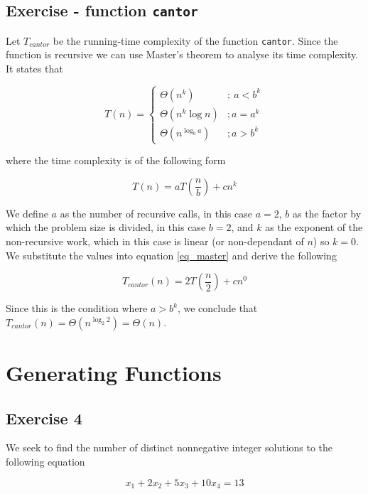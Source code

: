\documentclass[a4paper]{article}
\begin{document}
\subsection{Exercise - function \texttt{cantor}}
Let $T_{cantor}$ be the running-time complexity of the function \texttt{cantor}. Since the function is recursive we can use Master's theorem
to analyse its time complexity. It states that

\begin{equation*}
    T(n) = \left \{ 
        \begin{array}{lc}
            \Theta (n^k)&;\ a < b^k\\
            \Theta (n^k \log n)&; a = a^k\\
            \Theta (n^{\log_b a})&; a > b^k
        \end{array}
    \right .    
\end{equation*}

\noindent
where  the time complexity is of the following form

\label{eq_master}
\begin{equation}
    T(n) = aT(\frac n b) + cn^k
\end{equation}

We define $a$ as the number of recursive calls, in this case $a = 2$, $b$ as the factor by which the problem size is divided, in this case $b=2$, and
$k$ as the exponent of the non-recursive work, which in this case is linear (or non-dependant of $n$) so $k = 0$. We substitute the values into equation
\ref{eq_master} and derive the following

\begin{equation}
    T_{cantor} (n) = 2T(\frac n 2) + cn^0
\end{equation}

Since this is the condition where $a > b^k$, we conclude that $T_{cantor} (n) = \Theta (n^{\log_2 2}) = \Theta(n)$.

\section{Generating Functions}

\subsection{Exercise 4}

We seek to find the number of distinct nonnegative integer solutions to the following equation

\label{naloga4}
\begin{equation}
    x_1 + 2x_2 + 5x_3 + 10x_4 = 13
\end{equation}
\end{document}
